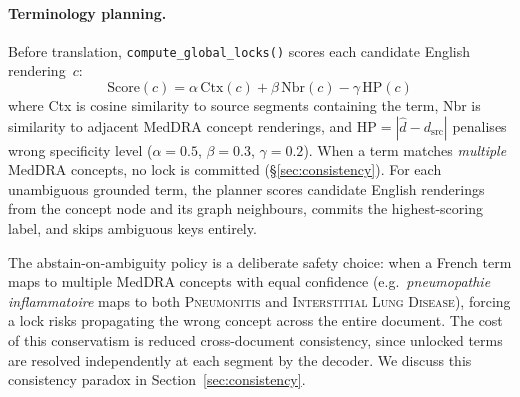 \documentclass[11pt,a4paper,twocolumn]{article}
\begin{document}
\begin{table}[!ht]
\centering
{}
\caption{Ablation ladder. S1 = NMT lower bound; S2 = LLM with full document
context; S3 is the key novel condition; S6 isolates term-source quality from
graph retrieval.}
\label{tab:systems}
\end{table}

\paragraph{Terminology planning.}
Before translation, \texttt{compute\_global\_locks()} scores each candidate
English rendering~$c$:
\begin{equation}
\text{Score}(c) = \alpha\,\text{Ctx}(c) + \beta\,\text{Nbr}(c)
               - \gamma\,\text{HP}(c)
\end{equation}
where Ctx is cosine similarity to source segments containing the term,
Nbr is similarity to adjacent MedDRA concept renderings, and
$\text{HP} = |\hat{d} - d_{\text{src}}|$ penalises wrong specificity level
($\alpha{=}0.5$, $\beta{=}0.3$, $\gamma{=}0.2$). When a term matches
\emph{multiple} MedDRA concepts, no lock is committed
(\S\ref{sec:consistency}).
For each unambiguous grounded term, the planner scores candidate English
renderings from the concept node and its graph neighbours, commits the
highest-scoring label, and skips ambiguous keys entirely.

The abstain-on-ambiguity policy is a deliberate safety choice: when a French
term maps to multiple MedDRA concepts with equal confidence (e.g.\
\textit{pneumopathie inflammatoire} maps to both \textsc{Pneumonitis} and
\textsc{Interstitial Lung Disease}), forcing a lock risks propagating the wrong
concept across the entire document. The cost of this conservatism is reduced
cross-document consistency, since unlocked terms are resolved independently at
each segment by the decoder. We discuss this consistency paradox in
Section~\ref{sec:consistency}.
\end{document}

